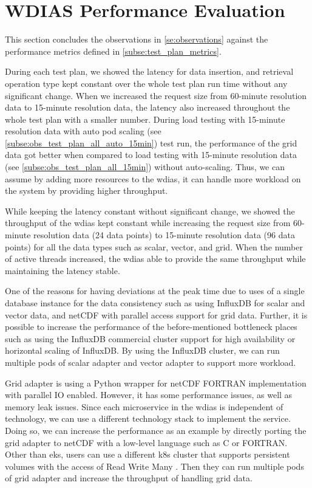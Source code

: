 \section{WDIAS Performance Evaluation}
\label{se:discussion}

This section concludes the observations in \cref{se:observations} against the performance metrics defined in \cref{subse:test_plan_metrics}.

During each test plan, we showed the latency for data insertion, and retrieval operation type kept constant over the whole test plan run time without any significant change. When we increased the request size from 60-minute resolution data to 15-minute resolution data, the latency also increased throughout the whole test plan with a smaller number.
During load testing with 15-minute resolution data with auto pod
scaling (see \cref{subse:obs_test_plan_all_auto_15min}) test run, the performance of the grid data got better when compared to load testing with 15-minute resolution data (see \cref{subse:obs_test_plan_all_15min}) without auto-scaling. Thus, we can assume by adding more resources to the \acrshort{wdias}, it can handle more workload on the system by providing higher throughput.

While keeping the latency constant without significant change, we showed the throughput of the \acrshort{wdias} kept constant while increasing the request size from 60-minute resolution data (24 data points) to 15-minute resolution data (96 data points) for all the data types such as scalar, vector, and grid. When the number of active threads increased, the \acrshort{wdias} able to provide the same throughput while maintaining the latency stable.

One of the reasons for having deviations at the peak time due to uses of a single database instance for the data consistency such as using InfluxDB for scalar and vector data, and netCDF with parallel access support for grid data. Further, it is possible to increase the performance of the before-mentioned bottleneck places such as using the InfluxDB commercial cluster support for high availability or horizontal scaling of InfluxDB. By using the InfluxDB cluster, we can run multiple pods of scalar adapter and vector adapter to support more workload.

Grid adapter is using a Python wrapper for netCDF FORTRAN implementation with parallel IO enabled. However, it has some performance issues, as well as memory leak issues. Since each microservice in the \acrshort{wdias} is independent of technology, we can use a different technology stack to implement the service. Doing so, we can increase the performance as an example by directly porting the grid adapter to netCDF with a low-level language such as C or FORTRAN. Other than \acrshort{eks}, users can use a different \acrshort{k8s} cluster that supports persistent volumes with the access of Read Write Many \cite{LinuxFoundationKubernetesVolumes}. Then they can run multiple pods of grid adapter and increase the throughput of handling grid data.


